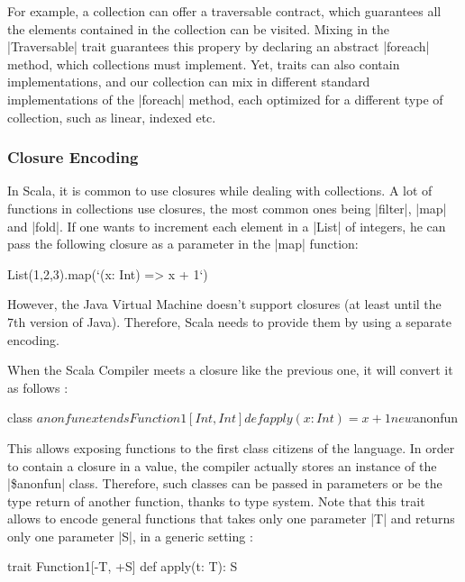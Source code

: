 For example, a collection can offer a traversable contract, which guarantees all the elements contained in the collection can be visited. Mixing in the |Traversable| trait guarantees this propery by declaring an abstract |foreach| method, which collections must implement. Yet, traits can also contain implementations, and our collection can mix in different standard implementations of the |foreach| method, each optimized for a different type of collection, such as linear, indexed etc.

\subsubsection{Closure Encoding}

In Scala, it is common to use closures while dealing with collections. A lot of functions in collections use closures, the most common ones being |filter|, |map| and |fold|. If one wants to increment each element in a |List| of integers, he can pass the following closure as a parameter in the |map| function:

\begin{lstlisting-nobreak}
 List(1,2,3).map(`(x: Int) => x + 1`)
\end{lstlisting-nobreak}

 However, the Java Virtual Machine doesn't support closures (at least until the 7th version of Java). Therefore, Scala needs to provide them by using a separate encoding.

When the Scala Compiler meets a closure like the previous one, it will convert it as follows :

\begin{lstlisting-nobreak}
 {
  class $anonfun extends Function1[Int, Int] {
    def apply(x: Int) = x + 1
  }

  new $anonfun
 }
\end{lstlisting-nobreak}

This allows exposing functions to the first class citizens of the language. In order to contain a closure in a value, the compiler actually stores an instance of the |\$anonfun| class. Therefore, such classes can be passed in parameters or be the type return of another function, thanks to type system. Note that this trait allows to encode general functions that takes only one parameter |T| and returns only one parameter |S|, in a generic setting :

\begin{lstlisting-nobreak}
 trait Function1[-T, +S] {
   def apply(t: T): S
 }
\end{lstlisting-nobreak}

